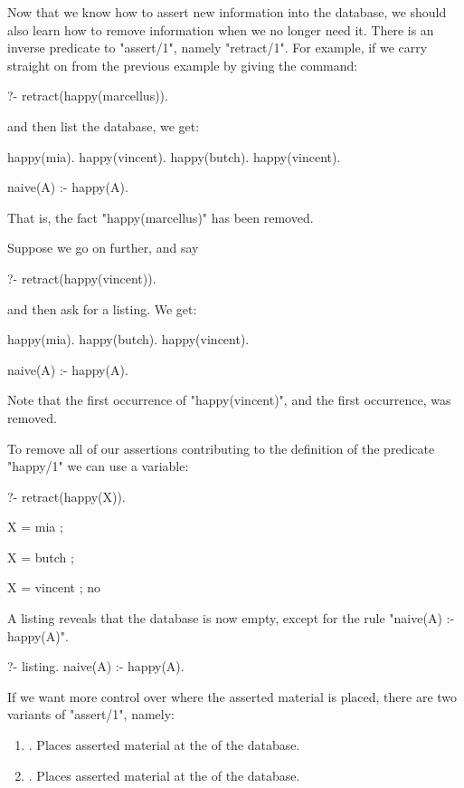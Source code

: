 Now that we know how to assert new information into the database, we
should also learn how to remove information when we no longer need
it.  There is an inverse predicate to "assert/1", namely "retract/1".
For example, if we carry  straight on from the previous example
by giving  the command:
\begin{LPNcodedisplay}
?- retract(happy(marcellus)).
\end{LPNcodedisplay}
and then list the database, we get:
\begin{LPNcodedisplay}
happy(mia).
happy(vincent).
happy(butch).
happy(vincent).

naive(A) :-
    happy(A).
\end{LPNcodedisplay}
That is, the fact "happy(marcellus)" has been removed.

Suppose
we go on further, and say
\begin{LPNcodedisplay}
?- retract(happy(vincent)).
\end{LPNcodedisplay}
and then ask for a listing. We get:
\begin{LPNcodedisplay}
happy(mia).
happy(butch).
happy(vincent).

naive(A) :-
    happy(A).
\end{LPNcodedisplay}
Note that the first occurrence of "happy(vincent)", and 
the first occurrence, was removed.

To remove all of our assertions contributing to the
definition of the predicate "happy/1" we can use a variable:
\begin{LPNcodedisplay}
?- retract(happy(X)).

X = mia ;

X = butch ;

X = vincent ;
no
\end{LPNcodedisplay}
A listing reveals that the database is now empty, except for the rule
"naive(A) :- happy(A)".
\begin{LPNcodedisplay}
?- listing.
naive(A) :-
    happy(A).
\end{LPNcodedisplay}

\clearpage
If we want more control over where the asserted material is placed,
there are two variants of "assert/1", namely:
\begin{enumerate}
\item{}.  Places asserted material at the 
of the database.
\item{}.  Places asserted material at the
 of the database.
\end{enumerate}

